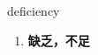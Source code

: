 
\begin{frame}
{\huge deficiency}
\begin{center}
\begin{enumerate}\Large
  \item \textbf{缺乏，不足}
\end{enumerate}
\end{center}
\end{frame}
